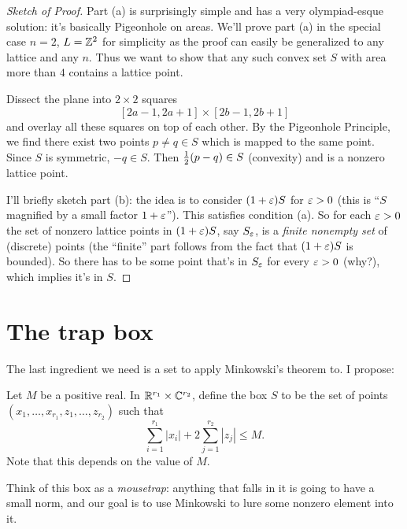 \begin{proof}[Sketch of Proof]
	Part (a) is surprisingly simple and has a very olympiad-esque solution:
	it's basically Pigeonhole on areas.
	We'll prove part (a) in the special case $n=2$,
	$L = \mathbb Z^2$ for simplicity as the proof
	can easily be generalized to any lattice and any $n$.
	Thus we want to show that any such convex set $S$
	with area more than $4$ contains a lattice point.

	Dissect the plane into $2 \times 2$ squares
	\[ [2a-1, 2a+1] \times [2b-1, 2b+1] \]
	and overlay all these squares on top of each other.
	By the Pigeonhole Principle, we find there exist two points $p \neq q \in S$
	which is mapped to the same point.
	Since $S$ is symmetric, $-q \in S$. Then $\frac{1}{2} (p-q) \in S$ (convexity) and is a nonzero lattice point.

	I'll briefly sketch part (b): the idea is to consider $(1+\varepsilon) S$ for $\varepsilon > 0$
	(this is ``$S$ magnified by a small factor $1+\varepsilon$'').
	This satisfies condition (a). So for each $\varepsilon > 0$ the set of nonzero lattice points in $(1+\varepsilon) S$,
	say $S_\varepsilon$, is a \emph{finite nonempty set} of (discrete) points
	(the ``finite'' part follows from the fact that $(1+\varepsilon)S$ is bounded).
	So there has to be some point that's in $S_\varepsilon$ for every $\varepsilon > 0$ (why?), which implies it's in $S$.
\end{proof}

\section{The trap box}
The last ingredient we need is a set to apply Minkowski's theorem to.  I propose:
\begin{definition}
	Let $M$ be a positive real.
	In $\mathbb R^{r_1} \times \mathbb C^{r_2}$, define the box $S$ to be the
	set of points $(x_1, \dots, x_{r_1}, z_1, \dots, z_{r_2})$ such that
	\[
		\sum_{i=1}^{r_1} \left\lvert x_i \right\rvert
		+ 2 \sum_{j=1}^{r_2} \left\lvert z_j \right\rvert
		\le M.
	\]
	Note that this depends on the value of $M$.
\end{definition}

Think of this box as a \emph{mousetrap}: anything that falls in it is going to have a small norm,
and our goal is to use Minkowski to lure some nonzero element into it.

